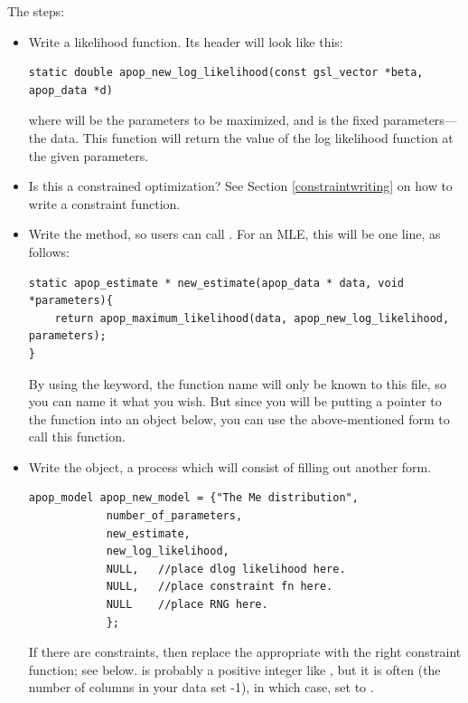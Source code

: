 The steps:

\begin{itemize}
\item Write a likelihood function. Its header will look like this:
\begin{lstlisting}
static double apop_new_log_likelihood(const gsl_vector *beta, apop_data *d)
\end{lstlisting}
where  will be the parameters to be maximized, and  is the fixed parameters---the data. 
This function will return the value of the log likelihood function at the given parameters.

\item Is this a constrained optimization? See Section
\ref{constraintwriting} on how to write a constraint function.

\item Write the  method, so users can call 
. For an MLE, this will be one line,
as follows:
\begin{lstlisting}
static apop_estimate * new_estimate(apop_data * data, void *parameters){
    return apop_maximum_likelihood(data, apop_new_log_likelihood, parameters);
}
\end{lstlisting}
By using the  keyword, the function name will only be
known to this file, so you can name it what you wish.  But since you
will be putting a pointer to the function into an object below, you
can use the above-mentioned 
form to call this function. 


\item Write the object, a process which will consist of filling out
another form. 
\begin{lstlisting}
apop_model apop_new_model = {"The Me distribution", 
            number_of_parameters, 
            new_estimate,
            new_log_likelihood, 
            NULL,   //place dlog likelihood here.
            NULL,   //place constraint fn here.
            NULL    //place RNG here.
            };
\end{lstlisting}
If there are constraints, then replace the appropriate  with the right constraint function; see below.
 is probably a positive integer like , but
it is often (the number of columns in your data set -1), in which case,
set  to .


\end{itemize}
